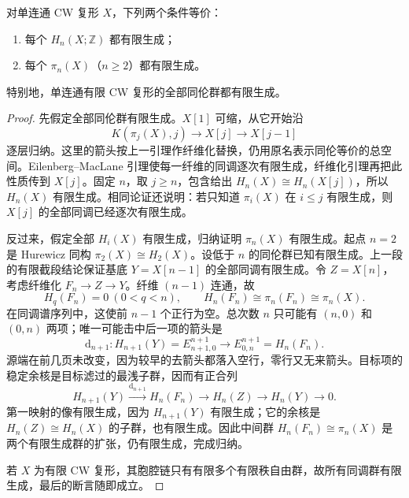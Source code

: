 \begin{theorem}\label{g2:thm:serre-finite-generation}
	对单连通 CW 复形 \(X\)，下列两个条件等价：
	\begin{enumerate}
		\item 每个 \(H_n(X;\mathbb Z)\) 都有限生成；
		\item 每个 \(\pi_n(X)\)（\(n\ge2\)）都有限生成。
	\end{enumerate}
	特别地，单连通有限 CW 复形的全部同伦群都有限生成。
\end{theorem}
\begin{proof}
	先假定全部同伦群有限生成。\(X[1]\) 可缩，从它开始沿
	\[
		K(\pi_j(X),j)\longrightarrow X[j]\longrightarrow X[j-1]
	\]
	逐层归纳。这里的箭头按上一引理作纤维化替换，仍用原名表示同伦等价的总空间。Eilenberg–MacLane 引理使每一纤维的同调逐次有限生成，纤维化引理再把此性质传到 \(X[j]\)。固定 \(n\)，取 \(j\ge n\)，包含给出 \(H_n(X)\cong H_n(X[j])\)，所以 \(H_n(X)\) 有限生成。相同论证还说明：若只知道 \(\pi_i(X)\) 在 \(i\le j\) 有限生成，则 \(X[j]\) 的全部同调已经逐次有限生成。

	反过来，假定全部 \(H_i(X)\) 有限生成，归纳证明 \(\pi_n(X)\) 有限生成。起点 \(n=2\) 是 Hurewicz 同构 \(\pi_2(X)\cong H_2(X)\)。设低于 \(n\) 的同伦群已知有限生成。上一段的有限截段结论保证基底 \(Y=X[n-1]\) 的全部同调有限生成。令 \(Z=X[n]\)，考虑纤维化 \(F_n\to Z\to Y\)。纤维 \((n-1)\) 连通，故
	\[
		H_q(F_n)=0\ (0<q<n),\qquad H_n(F_n)\cong\pi_n(F_n)\cong\pi_n(X).
	\]
	在同调谱序列中，这使前 \(n-1\) 个正行为空。总次数 \(n\) 只可能有 \((n,0)\) 和 \((0,n)\) 两项；唯一可能击中后一项的箭头是
	\[
		\mathrm d_{n+1}:H_{n+1}(Y)=E^{n+1}_{n+1,0}\longrightarrow E^{n+1}_{0,n}=H_n(F_n).
	\]
	源端在前几页未改变，因为较早的去箭头都落入空行，零行又无来箭头。目标项的稳定余核是目标滤过的最浅子群，因而有正合列
	\begin{equation}\label{g2:eq:finite-generation-five-terms}
		H_{n+1}(Y)\xrightarrow{\mathrm d_{n+1}}H_n(F_n)
		\longrightarrow H_n(Z)\longrightarrow H_n(Y)\longrightarrow0.
	\end{equation}
	第一映射的像有限生成，因为 \(H_{n+1}(Y)\) 有限生成；它的余核是 \(H_n(Z)\cong H_n(X)\) 的子群，也有限生成。因此中间群 \(H_n(F_n)\cong\pi_n(X)\) 是两个有限生成群的扩张，仍有限生成，完成归纳。

	若 \(X\) 为有限 CW 复形，其胞腔链只有有限多个有限秩自由群，故所有同调群有限生成，最后的断言随即成立。
\end{proof}

